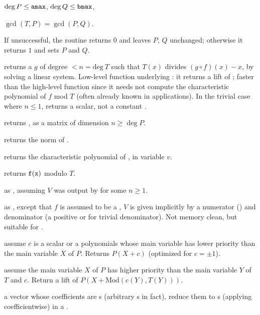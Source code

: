 \item $\deg P \leq {\tt amax}$, $\deg Q \leq {\tt bmax}$,

\item $\gcd(T,P) = \gcd(P,Q)$.

\noindent If unsuccessful, the routine returns $0$ and leaves $P$, $Q$
unchanged; otherwise it returns $1$ and sets $P$ and $Q$.

 returns a  $g$ of degree $< n
= \text{deg}~T$ such that $T(x)$ divides $(g \circ f)(x) - x$, by solving a
linear system. Low-level function underlying : it returns a
lift of \kbd[modreverse(f,T)]; faster than the high-level function since it
needs not compute the characteristic polynomial of $f$ mod $T$ (often already
known in applications). In the trivial case where $n \leq 1$, returns a
scalar, not a constant .

 returns
, as a matrix of dimension $n \geq \deg P$.

 returns the norm of .

 returns the characteristic
polynomial of , in variable $v$.

 returns ${\tt f}({\tt x})$ modulo
$T$.

 as ,
assuming $V$ was output by  for some $n\geq 1$.

 as ,
except that $f$ is assumed to be a , $V$ is given implicitly
by a numerator  () and denominator  (a positive
 or  for trivial denominator). Not memory clean, but
suitable for .

 assume $c$ is a scalar or
a polynomials whose main variable has lower priority than the main variable
$X$ of $P$. Returns $P(X + c)$ (optimized for $c = \pm 1$).

 assume the main variable
$X$ of $P$ has higher priority than the main variable $Y$ of $T$ and $c$.
Return a lift of $P(X+\text{Mod}(c(Y), T(Y)))$.

  a vector whose
coefficients are s (arbitrary s in fact), reduce them to
s (applying  coefficientwise) in a .

